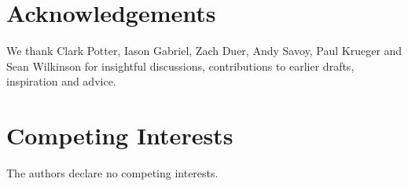 \documentclass[11pt]{article}
\begin{document}





\section*{Acknowledgements} 

We thank Clark Potter, Iason Gabriel, Zach Duer, Andy Savoy, Paul Krueger and Sean Wilkinson for insightful discussions, contributions to earlier drafts, inspiration and advice.

\section*{Competing Interests}

The authors declare no competing interests.


\end{document}
